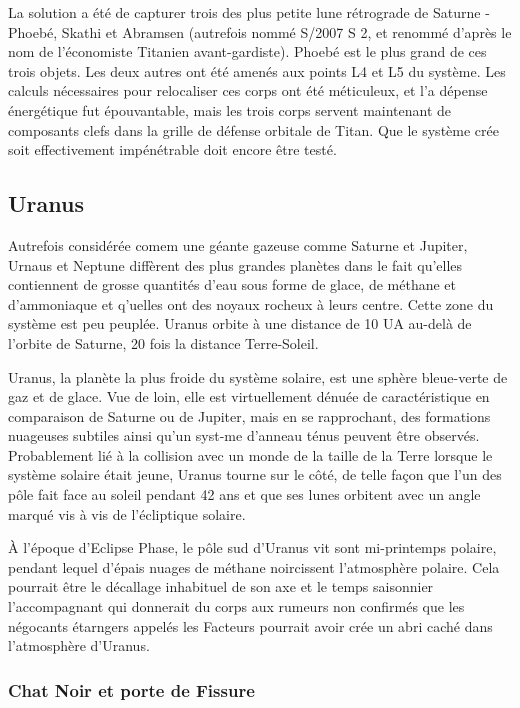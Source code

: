 La solution a été de capturer trois des plus petite lune rétrograde de Saturne - Phoebé, Skathi et Abramsen (autrefois nommé S/2007 S 2, et renommé d'après le nom de l'économiste Titanien avant-gardiste). Phoebé est le plus grand de ces trois objets. Les deux autres ont été amenés aux points L4 et L5 du système. Les calculs nécessaires pour relocaliser ces corps ont été méticuleux, et l'a dépense énergétique fut épouvantable, mais les trois corps servent maintenant de composants clefs dans la grille de défense orbitale de Titan. Que le système crée soit effectivement impénétrable doit encore être testé. 

\subsection{Uranus} \label{sec:uranus} 

Autrefois considérée comem une géante gazeuse comme Saturne et Jupiter, Urnaus et Neptune diffèrent des plus grandes planètes dans le fait qu'elles contiennent de grosse quantités d'eau sous forme de glace, de méthane et d'ammoniaque et q'uelles ont des noyaux rocheux à leurs centre. Cette zone du système est peu peuplée. Uranus orbite à une distance de 10 UA au-delà de l'orbite de Saturne, 20 fois la distance Terre-Soleil. 

Uranus, la planète la plus froide du système solaire, est une sphère bleue-verte de gaz et de glace. Vue de loin, elle est virtuellement dénuée de caractéristique en comparaison de Saturne ou de Jupiter, mais en se rapprochant, des formations nuageuses subtiles ainsi qu'un syst-me d'anneau ténus peuvent être observés. Probablement lié à la collision avec un monde de la taille de la Terre lorsque le système solaire était jeune, Uranus tourne sur le côté, de telle façon que l'un des pôle fait face au soleil pendant 42 ans et que ses lunes orbitent avec un angle marqué vis à vis de l'écliptique solaire. 

À l'époque d'Eclipse Phase, le pôle sud d'Uranus vit sont mi-printemps polaire, pendant lequel d'épais nuages de méthane noircissent l'atmosphère polaire. Cela pourrait être le décallage inhabituel de son axe et le temps saisonnier l'accompagnant qui donnerait du corps aux rumeurs non confirmés que les négocants étarngers appelés les Facteurs pourrait avoir crée un abri caché dans l'atmosphère d'Uranus. 

\subsubsection{Chat Noir et porte de Fissure} \label{sec:chat-noir-fissure} 

